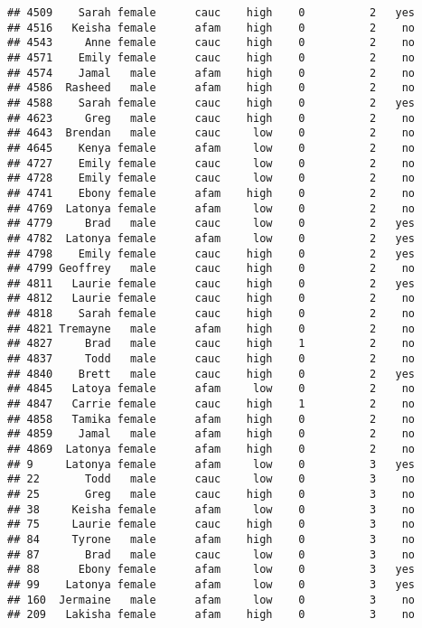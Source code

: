 \documentclass[
]{article}
\begin{document}
\begin{verbatim}
## 4509    Sarah female      cauc    high    0          2   yes
## 4516   Keisha female      afam    high    0          2    no
## 4543     Anne female      cauc    high    0          2    no
## 4571    Emily female      cauc    high    0          2    no
## 4574    Jamal   male      afam    high    0          2    no
## 4586  Rasheed   male      afam    high    0          2    no
## 4588    Sarah female      cauc    high    0          2   yes
## 4623     Greg   male      cauc    high    0          2    no
## 4643  Brendan   male      cauc     low    0          2    no
## 4645    Kenya female      afam     low    0          2    no
## 4727    Emily female      cauc     low    0          2    no
## 4728    Emily female      cauc     low    0          2    no
## 4741    Ebony female      afam    high    0          2    no
## 4769  Latonya female      afam     low    0          2    no
## 4779     Brad   male      cauc     low    0          2   yes
## 4782  Latonya female      afam     low    0          2   yes
## 4798    Emily female      cauc    high    0          2   yes
## 4799 Geoffrey   male      cauc    high    0          2    no
## 4811   Laurie female      cauc    high    0          2   yes
## 4812   Laurie female      cauc    high    0          2    no
## 4818    Sarah female      cauc    high    0          2    no
## 4821 Tremayne   male      afam    high    0          2    no
## 4827     Brad   male      cauc    high    1          2    no
## 4837     Todd   male      cauc    high    0          2    no
## 4840    Brett   male      cauc    high    0          2   yes
## 4845   Latoya female      afam     low    0          2    no
## 4847   Carrie female      cauc    high    1          2    no
## 4858   Tamika female      afam    high    0          2    no
## 4859    Jamal   male      afam    high    0          2    no
## 4869  Latonya female      afam    high    0          2    no
## 9     Latonya female      afam     low    0          3   yes
## 22       Todd   male      cauc     low    0          3    no
## 25       Greg   male      cauc    high    0          3    no
## 38     Keisha female      afam     low    0          3    no
## 75     Laurie female      cauc    high    0          3    no
## 84     Tyrone   male      afam    high    0          3    no
## 87       Brad   male      cauc     low    0          3    no
## 88      Ebony female      afam     low    0          3   yes
## 99    Latonya female      afam     low    0          3   yes
## 160  Jermaine   male      afam     low    0          3    no
## 209   Lakisha female      afam    high    0          3    no

\end{verbatim}
\end{document}
